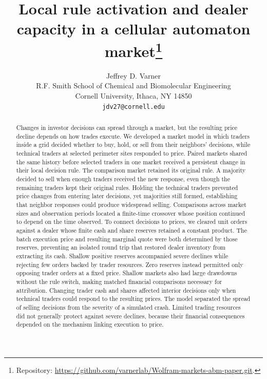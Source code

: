 \documentclass{article}
\title{Local rule activation and dealer capacity in a cellular automaton market\thanks{Repository: \url{https://github.com/varnerlab/Wolfram-markets-abm-paper.git}.}}
\author{%
  Jeffrey D. Varner \\
  R.F. Smith School of Chemical and Biomolecular Engineering\\
  Cornell University, Ithaca, NY 14850 \\
  \texttt{jdv27@cornell.edu} \\
}
\theoremstyle{definition}
\theoremstyle{remark}
\begin{document}
\raggedbottom

\maketitle

\begin{abstract}
Changes in investor decisions can spread through a market, but the resulting
price decline depends on how trades execute. We developed a market model
in which traders inside a grid decided whether to buy, hold, or sell from
their neighbors' decisions, while technical traders at selected perimeter
sites responded to price. Paired markets shared the same history before
selected traders in one market received a persistent change in their
local decision rule. The comparison market retained its original rule.
A majority decided to sell when enough traders received the new response,
even though the remaining traders kept their original rules. Holding the
technical traders prevented price changes from entering later decisions,
yet majorities still formed, establishing that neighbor responses could
produce widespread selling. Comparisons across market sizes and observation
periods located a finite-time crossover whose position continued to depend
on the time observed. To connect decisions to prices, we cleared unit
orders against a dealer whose finite cash and share reserves retained a
constant product. The batch execution price and resulting marginal quote
were both determined by those reserves, preventing an isolated round trip
that restored dealer inventory from extracting its cash. Shallow positive
reserves accompanied severe declines while rejecting few orders backed by
trader resources. Zero reserves instead permitted only opposing trader
orders at a fixed price. Shallow markets also had large drawdowns without
the rule switch, making matched financial comparisons necessary for
attribution. Changing trader cash and shares affected interior decisions
only when technical traders could respond to the resulting prices.
The model separated the spread of selling decisions from the severity of
a simulated crash. Limited trading resources did not generally protect
against severe declines, because their financial consequences depended on
the mechanism linking execution to price.
\end{abstract}


\end{document}
